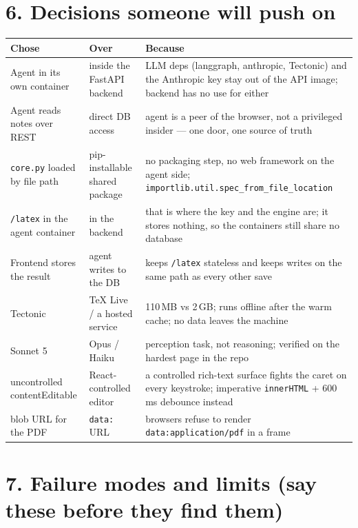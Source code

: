 \documentclass[10pt]{article}
\newcommand{\code}[1]{\texttt{\small #1}}
\begin{document}
\section*{6. Decisions someone will push on}

\begin{tabular}{@{}p{4.1cm}p{5.6cm}p{7.3cm}@{}}
\toprule
\textbf{Chose} & \textbf{Over} & \textbf{Because} \\
\midrule
Agent in its own container & inside the FastAPI backend & LLM deps (langgraph, anthropic, Tectonic) and the Anthropic key stay out of the API image; backend has no use for either \\
Agent reads notes over REST & direct DB access & agent is a peer of the browser, not a privileged insider --- one door, one source of truth \\
\code{core.py} loaded by file path & pip-installable shared package & no packaging step, no web framework on the agent side; \code{importlib.util.spec\_from\_file\_location} \\
\code{/latex} in the agent container & in the backend & that is where the key and the engine are; it stores nothing, so the containers still share no database \\
Frontend stores the result & agent writes to the DB & keeps \code{/latex} stateless and keeps writes on the same path as every other save \\
Tectonic & TeX Live / a hosted service & 110\,MB vs 2\,GB; runs offline after the warm cache; no data leaves the machine \\
Sonnet 5 & Opus / Haiku & perception task, not reasoning; verified on the hardest page in the repo \\
uncontrolled contentEditable & React-controlled editor & a controlled rich-text surface fights the caret on every keystroke; imperative \code{innerHTML} + 600\,ms debounce instead \\
blob URL for the PDF & \code{data:} URL & browsers refuse to render \code{data:application/pdf} in a frame \\
\bottomrule
\end{tabular}

\section*{7. Failure modes and limits (say these before they find them)}
\end{document}
